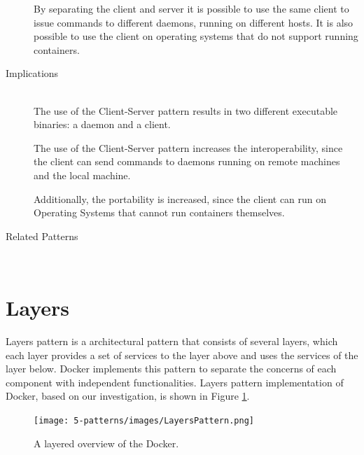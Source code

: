\begin{description}

By separating the client and server it is possible to use the same client to issue commands to different daemons, running on different hosts.
It is also possible to use the client on operating systems that do not support running containers.

\item [Implications]~\\
The use of the {Client-Server} pattern results in two different executable binaries: a daemon and a client. 

The use of the {Client-Server} pattern increases the interoperability, since the client can send commands to daemons running on remote machines and the local machine.

Additionally, the portability is increased, since the client can run on Operating Systems that cannot run containers themselves.


\item [Related Patterns]~\\


\end{description}

\clearpage
\section{Layers}
Layers pattern is a architectural pattern that consists of several layers, which
each layer provides a set of services to the layer above and uses the services
of the layer below. Docker implements this pattern to separate the concerns of
each component with independent functionalities. Layers pattern implementation
of Docker, based on our investigation, is shown in Figure \ref{fig:layers-pattern}.

\begin{figure}[H]
\centering
\texttt{[image: 5-patterns/images/LayersPattern.png]}
\caption{A layered overview of the Docker.}
\label{fig:layers-pattern}
\end{figure}

